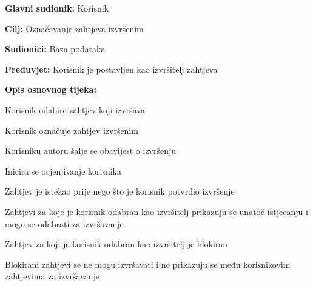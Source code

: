 					\noindent {}
					\begin{packed_item}
						
						\item \textbf{Glavni sudionik: }Korisnik
						\item  \textbf{Cilj:} Označavanje zahtjeva izvršenim 
						\item  \textbf{Sudionici:} Baza podataka
						\item  \textbf{Preduvjet:} Korisnik je postavljen kao izvršitelj zahtjeva
						\item  \textbf{Opis osnovnog tijeka:}
						
						\item[] \begin{packed_enum}
							
							\item Korisnik odabire zahtjev koji izvršava
							\item Korisnik označuje zahtjev izvršenim
							\item Korisniku autoru šalje se obavijest o izvršenju
							\item Inicira se ocjenjivanje korisnika
							
						\end{packed_enum}
						
						\item[1.a] Zahtjev je istekao prije nego što je korisnik potvrdio izvršenje
						\item[] \begin{packed_enum}
							
							\item Zahtjevi za koje je korisnik odabran kao izvršitelj prikazuju se unatoč istjecanju i mogu se odabrati za izvršavanje
							
						\end{packed_enum}
						\item[1.b] Zahtjev za koji je korisnik odabran kao izvršitelj je blokiran
						\item[] \begin{packed_enum}
							
							\item Blokirani zahtjevi se ne mogu izvršavati i ne prikazuju se među korisnikovim zahtjevima za izvršavanje
							
						\end{packed_enum}
						
						
					\end{packed_item}
				
